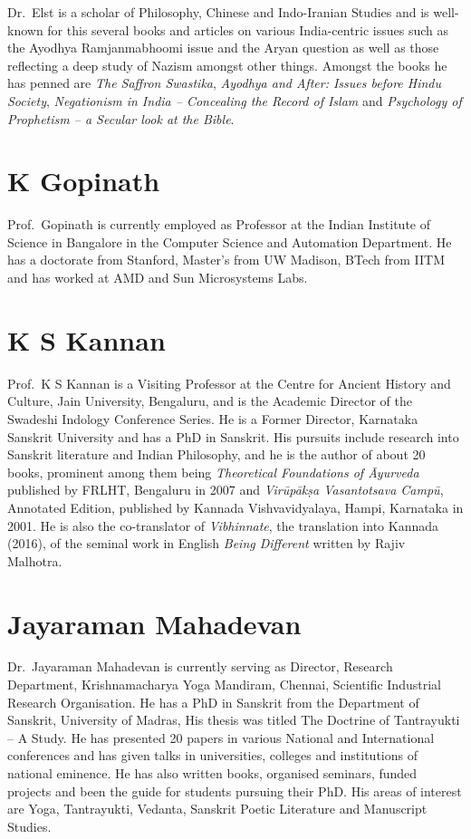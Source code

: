 Dr.~Elst is a scholar of Philosophy, Chinese and Indo-Iranian Studies and is well-known for this several books and articles on various India-centric issues such as the Ayodhya Ramjanmabhoomi issue and the Aryan question as well as those reflecting a deep study of Nazism amongst other things. Amongst the books he has penned are {\sl The Saffron Swastika}, {\sl Ayodhya and After: Issues before Hindu Society}, {\sl Negationism in India – Concealing the Record of Islam} and {\sl Psychology of Prophetism – a Secular look at the Bible}. 

\section*{K Gopinath}

Prof.~Gopinath is currently employed as Professor at the Indian Institute of Science in Bangalore in the Computer Science and Automation Department. He has a doctorate from Stanford, Master’s from UW Madison, BTech from IITM and has worked at AMD and Sun Microsystems Labs.

\section*{K S Kannan}

Prof.~K S Kannan is a Visiting Professor at the Centre for Ancient History and Culture, Jain University, Bengaluru, and is the Academic Director of the Swadeshi Indology Conference Series. He is a Former Director, Karnataka Sanskrit University and has a PhD in Sanskrit. His pursuits include research into Sanskrit literature and Indian Philosophy, and he is the author of about 20 books, prominent among them being {\sl Theoretical Foundations of Āyurveda} published by FRLHT, Bengaluru in 2007 and {\sl Virūpākṣa Vasantotsava Campū}, Annotated Edition, published by Kannada Vishvavidyalaya, Hampi, Karnataka in 2001. He is also the co-translator of {\sl Vibhinnate}, the translation into Kannada (2016), of the seminal work in English {\sl Being Different} written by Rajiv Malhotra.

\section*{Jayaraman Mahadevan}

Dr.~Jayaraman Mahadevan is currently serving as Director, Research Department, Krishnamacharya Yoga Mandiram, Chennai, Scientific Industrial Research Organisation. He has a PhD in Sanskrit from the Department of Sanskrit, University of Madras, His thesis was titled The Doctrine of Tantrayukti – A Study. He has presented 20 papers in various National and International conferences and has given talks in universities, colleges and institutions of national eminence. He has also written books, organised seminars, funded projects and been the guide for students pursuing their PhD. His areas of interest are Yoga, Tantrayukti, Vedanta, Sanskrit Poetic Literature and Manuscript Studies.

